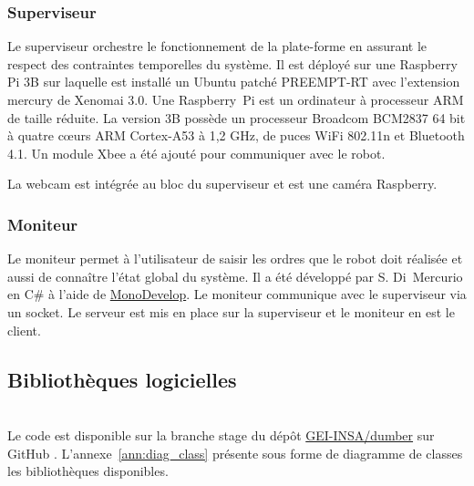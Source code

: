   \subsubsection{Superviseur}


Le superviseur orchestre le fonctionnement de la plate-forme en assurant le respect des contraintes temporelles du système. Il est déployé sur une Raspberry Pi 3B sur laquelle est installé un Ubuntu patché PREEMPT-RT avec l'extension mercury de Xenomai 3.0. Une Raspberry~Pi est un ordinateur à processeur ARM de taille réduite. La version 3B possède un processeur Broadcom BCM2837 64 bit à quatre cœurs ARM Cortex-A53 à 1,2 GHz, de puces WiFi 802.11n et Bluetooth 4.1. Un module Xbee a été ajouté pour communiquer avec le robot.

La webcam est intégrée au bloc du superviseur et est une caméra Raspberry.

\subsubsection{Moniteur}

Le moniteur permet à l'utilisateur de saisir les ordres que le robot doit réalisée et aussi de connaître l'état global du système. Il a été développé par S. Di~Mercurio en C\# à l'aide de \href{https://www.monodevelop.com}{MonoDevelop}. Le moniteur communique avec le superviseur via un socket. Le serveur est mis en place sur la superviseur et le moniteur en est le client.

\subsection{Bibliothèques logicielles}

\\



Le code est disponible sur la branche stage du dépôt \href{https://github.com/INSA-GEI/dumber/}{GEI-INSA/dumber} sur GitHub . L'annexe~\ref{ann:diag_class} présente sous forme de diagramme de classes les bibliothèques disponibles.\\

